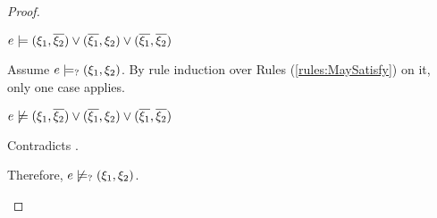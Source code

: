 \begin{proof}
\begin{byCases}
\begin{byCases}
\begin{byCases}
\begin{pfsteps*}
            \item $e \models (\xi_1 , \overline{\xi_2}) \vee (\overline{\xi_1} , \xi_2) \vee (\overline{\xi_1} , \overline{\xi_2})$  
            \end{pfsteps*}
            Assume $e \models_{?} (\xi_1 , \xi_2)$. By rule induction over Rules (\ref{rules:MaySatisfy}) on it, only one case applies.
            \begin{byCases}
            \item[\text{(\ref{rule:CMSNotVal})}]
                \begin{pfsteps*}
                \item $e \not\models (\xi_1 , \overline{\xi_2}) \vee (\overline{\xi_1} , \xi_2) \vee (\overline{\xi_1} , \overline{\xi_2})$ 
                \end{pfsteps*}
                Contradicts .
            \end{byCases}
            Therefore, $e \not\models_{?} (\xi_1 , \xi_2)$.
            

\end{byCases}
\end{byCases}
\end{byCases}
\end{proof}
